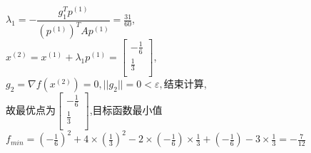 \begin{solution}
    $\lambda_1=-\dfrac{g_1^Tp^{(1)}}{(p^{(1)})^TAp^{(1)}}=\frac{31}{60}$,\\
    $x^{(2)}=x^{(1)}+\lambda_1p^{(1)}=\begin{bmatrix} -\frac{1}{6}\\\frac{1}{3}\\\end{bmatrix}$,\\
    $g_2=\nabla f(x^{(2)})=0,||g_2||=0<\varepsilon,\text{结束计算}$,\\
    故最优点为$\begin{bmatrix} -\frac{1}{6}\\\frac{1}{3}\\\end{bmatrix}$,目标函数最小值$f_{min}=(-\frac{1}{6})^2+4\times(\frac{1}{3})^2-2\times(-\frac{1}{6})\times\frac{1}{3}+(-\frac{1}{6})-3\times\frac{1}{3}=-\frac{7}{12}$
\end{solution}

